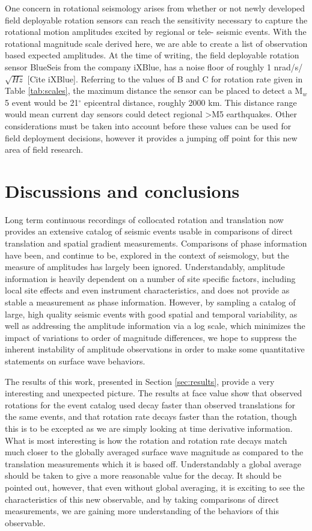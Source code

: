\documentclass{gji}
\begin{document}
One concern in rotational seismology arises from whether or not newly developed field deployable rotation sensors can reach the sensitivity necessary to capture the rotational motion amplitudes excited by regional or tele- seismic events. With the rotational magnitude scale derived here, we are able to create a list of observation based expected amplitudes. At the time of writing, the field deployable rotation sensor BlueSeis from the company iXBlue, has a noise floor of roughly 1 nrad/s/$\sqrt{Hz}$ [Cite iXBlue]. Referring to the values of B and C for rotation rate given in Table \ref{tab:scales}, the maximum distance the sensor can be placed to detect a M$_w$5 event would be 21$^\circ$ epicentral distance, roughly 2000 km. This distance range would mean current day sensors could detect regional >M5 earthquakes. Other considerations must be taken into account before these values can be used for field deployment decisions, however it provides a jumping off point for this new area of field research.


\section{Discussions and conclusions}
Long term continuous recordings of collocated rotation and translation now provides an extensive catalog of seismic events usable in comparisons of direct translation and spatial gradient measurements. Comparisons of phase information have been, and continue to be, explored in the context of seismology, but the measure of amplitudes has largely been ignored. Understandably, amplitude information is heavily dependent on a number of site specific factors, including local site effects and even instrument characteristics, and does not provide as stable a measurement as phase information. However, by sampling a catalog of large, high quality seismic events with good spatial and temporal variability, as well as addressing the amplitude information via a log scale, which minimizes the impact of variations to order of magnitude differences, we hope to suppress the inherent instability of amplitude observations in order to make some quantitative statements on surface wave behaviors.

The results of this work, presented in Section \ref{sec:results}, provide a very interesting and unexpected picture. The results at face value show that observed rotations for the event catalog used decay faster than observed translations for the same events, and that rotation rate decays faster than the rotation, though this is to be excepted as we are simply looking at time derivative information. What is most interesting is how the rotation and rotation rate decays match much closer to the globally averaged surface wave magnitude as compared to the translation measurements which it is based off. Understandably a global average should be taken to give a more reasonable value for the decay. It should be pointed out, however, that even without global averaging, it is exciting to see the characteristics of this new observable, and by taking comparisons of direct measurements, we are gaining more understanding of the behaviors of this observable.
\end{document}
